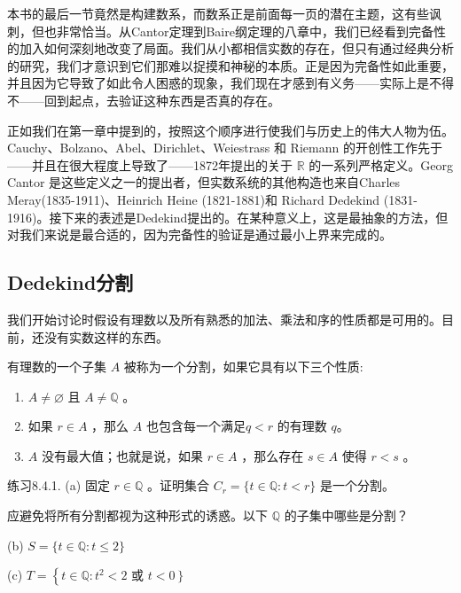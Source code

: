 本书的最后一节竟然是构建数系，而数系正是前面每一页的潜在主题，这有些讽刺，但也非常恰当。从Cantor定理到Baire纲定理的八章中，我们已经看到完备性的加入如何深刻地改变了局面。我们从小都相信实数的存在，但只有通过经典分析的研究，我们才意识到它们那难以捉摸和神秘的本质。正是因为完备性如此重要，并且因为它导致了如此令人困惑的现象，我们现在才感到有义务——实际上是不得不——回到起点，去验证这种东西是否真的存在。

正如我们在第一章中提到的，按照这个顺序进行使我们与历史上的伟大人物为伍。Cauchy、Bolzano、Abel、Dirichlet、Weiestrass 和 Riemann 的开创性工作先于——并且在很大程度上导致了——1872年提出的关于 \(\mathbb{R}\) 的一系列严格定义。Georg Cantor 是这些定义之一的提出者，但实数系统的其他构造也来自Charles Meray(1835-1911)、Heinrich Heine (1821-1881)和 Richard Dedekind (1831-1916)。接下来的表述是Dedekind提出的。在某种意义上，这是最抽象的方法，但对我们来说是最合适的，因为完备性的验证是通过最小上界来完成的。

\subsection{Dedekind分割}

我们开始讨论时假设有理数以及所有熟悉的加法、乘法和序的性质都是可用的。目前，还没有实数这样的东西。

\begin{Def}
  \label{def:8.4.2}
  有理数的一个子集 \(A\) 被称为一个分割，如果它具有以下三个性质:
\begin{enumerate}[label = (c\arabic*)]
\item\label{item:8.4.01}  \(A \neq  \varnothing\) 且 \(A \neq  \mathbb{Q}\) 。
\item\label{item:8.4.02}  如果 \(r \in  A\) ，那么 \(A\) 也包含每一个满足\(q < r\) 的有理数 $q$。
\item\label{item:8.4.03}  \(A\) 没有最大值；也就是说，如果 \(r \in  A\) ，那么存在 \(s \in  A\) 使得 \(r < s\) 。
\end{enumerate}
\end{Def}

练习8.4.1. (a) 固定 \(r \in  \mathbb{Q}\) 。证明集合 \({C}_{r} = \{ t \in  \mathbb{Q} : t < r\}\) 是一个分割。

应避免将所有分割都视为这种形式的诱惑。以下 \(\mathbb{Q}\) 的子集中哪些是分割？

(b) \(S = \{ t \in  \mathbb{Q} : t \leq  2\}\)

(c) \(T = \left\{  {t \in  \mathbb{Q} : {t}^{2} < 2}\right.\) 或 \(\left. {t < 0}\right\}\)

